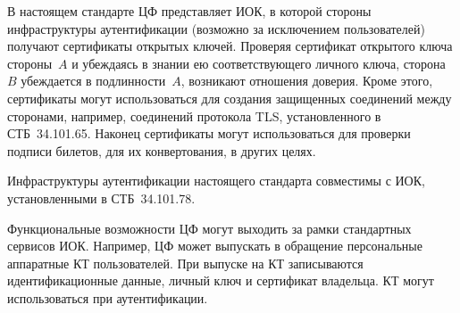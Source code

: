 В настоящем стандарте ЦФ представляет ИОК, в которой стороны инфраструктуры 
аутентификации (возможно за исключением пользователей) получают сертификаты 
открытых ключей. 
%
Проверяя сертификат открытого ключа стороны~$A$ и убеждаясь в знании ею 
соответствующего личного ключа, сторона~$B$ убеждается в подлинности~$A$,
возникают отношения доверия.
%
Кроме этого, сертификаты могут использоваться для создания защищенных 
соединений между сторонами, например, соединений протокола TLS, 
установленного в СТБ~34.101.65. 
%
Наконец сертификаты могут использоваться для проверки подписи билетов, для их 
конвертования, в других целях.  

Инфраструктуры аутентификации настоящего стандарта совместимы с ИОК, 
установленными в СТБ~34.101.78.

Функциональные возможности ЦФ могут выходить за рамки стандартных сервисов ИОК. 
Например, ЦФ может выпускать в обращение персональные аппаратные КТ 
пользователей. При выпуске на КТ записываются идентификационные данные, личный 
ключ и сертификат владельца. КТ могут использоваться при аутентификации.

